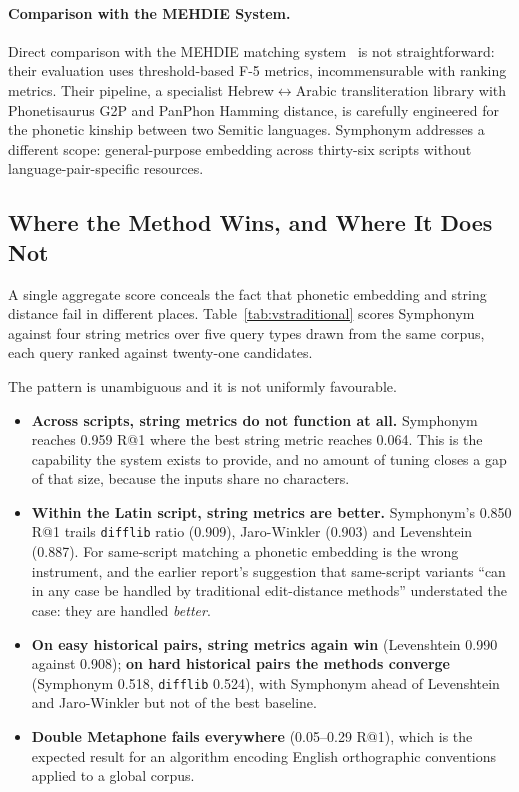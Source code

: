 \documentclass[11pt,a4paper]{article}
\begin{document}
\paragraph{Comparison with the MEHDIE System.} Direct comparison with the MEHDIE matching system~\citep{mehdie2025} is not straightforward: their evaluation uses threshold-based F-5 metrics, incommensurable with ranking metrics. Their pipeline, a specialist Hebrew$\leftrightarrow$Arabic transliteration library with Phonetisaurus G2P and PanPhon Hamming distance, is carefully engineered for the phonetic kinship between two Semitic languages. Symphonym addresses a different scope: general-purpose embedding across thirty-six scripts without language-pair-specific resources.

\subsection{Where the Method Wins, and Where It Does Not}
\label{subsec:vstraditional}

A single aggregate score conceals the fact that phonetic embedding and string distance fail in different places. Table~\ref{tab:vstraditional} scores Symphonym against four string metrics over five query types drawn from the same corpus, each query ranked against twenty-one candidates.

The pattern is unambiguous and it is not uniformly favourable.

\begin{itemize}
\item \textbf{Across scripts, string metrics do not function at all.} Symphonym reaches 0.959 R@1 where the best string metric reaches 0.064. This is the capability the system exists to provide, and no amount of tuning closes a gap of that size, because the inputs share no characters.
\item \textbf{Within the Latin script, string metrics are better.} Symphonym's 0.850 R@1 trails \texttt{difflib} ratio (0.909), Jaro-Winkler (0.903) and Levenshtein (0.887). For same-script matching a phonetic embedding is the wrong instrument, and the earlier report's suggestion that same-script variants ``can in any case be handled by traditional edit-distance methods'' understated the case: they are handled \emph{better}.
\item \textbf{On easy historical pairs, string metrics again win} (Levenshtein 0.990 against 0.908); \textbf{on hard historical pairs the methods converge} (Symphonym 0.518, \texttt{difflib} 0.524), with Symphonym ahead of Levenshtein and Jaro-Winkler but not of the best baseline.
\item \textbf{Double Metaphone fails everywhere} (0.05--0.29 R@1), which is the expected result for an algorithm encoding English orthographic conventions applied to a global corpus.
\end{itemize}
\end{document}
